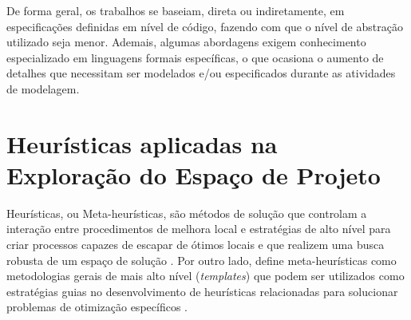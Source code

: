 \documentclass[tese-proposta,nocipinfo]{texufpel}
\begin{document}

De forma geral, os trabalhos se baseiam, direta ou indiretamente, em especificações definidas em nível de código, fazendo com que o nível de abstração utilizado seja menor. Ademais, algumas abordagens exigem conhecimento especializado em linguagens formais específicas, o que ocasiona o aumento de detalhes que necessitam ser modelados e/ou especificados durante as atividades de modelagem.


\section{Heurísticas aplicadas na Exploração do Espaço de Projeto}


Heurísticas, ou Meta-heurísticas, são métodos de solução que controlam a interação entre procedimentos de melhora local e estratégias de alto nível para criar processos capazes de escapar de ótimos locais e que realizem uma busca robusta de um espaço de solução \cite{gendreau2010handbook}. Por outro lado, \cite[p. 1.]{talbi2009metaheuristics} define meta-heurísticas como metodologias gerais de mais alto nível (\textit{templates}) que podem ser utilizados como estratégias guias no desenvolvimento de heurísticas relacionadas para solucionar problemas de otimização específicos .
\end{document}
